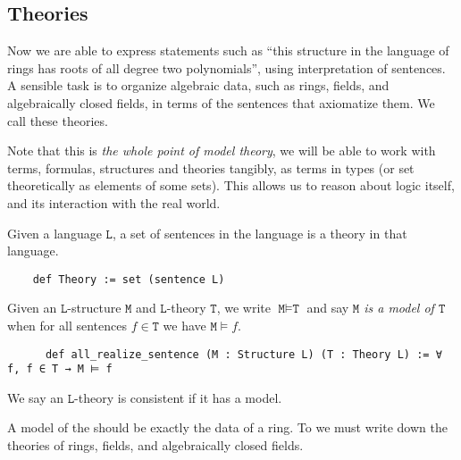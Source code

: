 \subsection{Theories}

Now we are able to express statements such as
``this structure in the language of rings has roots
of all degree two polynomials'', using interpretation of sentences.
A sensible task is to organize algebraic data, such as rings, fields,
and algebraically closed fields, in terms of the sentences that axiomatize them.
We call these theories.

Note that this is \textit{the whole point of model theory},
we will be able to work with terms, formulas, structures and theories tangibly,
as terms in types (or set theoretically as elements of some sets).
This allows us to reason about logic itself,
and its interaction with the real world.

\begin{dfn}[Theory]
  Given a language $\texttt{L}$,
  a set of sentences in the language is a theory in that language.
  \begin{lstlisting}
    def Theory := set (sentence L)   \end{lstlisting}
\end{dfn}

\begin{dfn}
    Given an $\texttt{L}$-structure $\texttt{M}$ and $\texttt{L}$-theory $\texttt{T}$,
    we write $\texttt{M} \vDash \texttt{T}$ and say
    \emph{$\texttt{M}$ is a model of $\texttt{T}$} when
    for all sentences $f \in \texttt{T}$ we have $\texttt{M} \vDash f$.

    \begin{lstlisting}
      def all_realize_sentence (M : Structure L) (T : Theory L) := ∀ f, f ∈ T → M ⊨ f \end{lstlisting}

    We say an $\texttt{L}$-theory is consistent if it has a model.
  \end{dfn}

A model of the  should be exactly the data of a ring.
To  we must write down the theories of
rings, fields, and algebraically closed fields.

